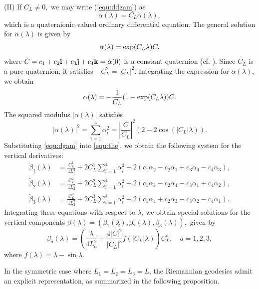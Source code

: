 \documentclass [12pt,a4paper]{amsart}
\newcommand{\bi}{{\bf i}}
\newcommand{\bj}{{\bf j}}
\newcommand{\bk}{{\bf k}}
\theoremstyle{plain}
\theoremstyle{definition}
\numberwithin{equation}{section}
\begin{document}
\smallskip
(II) If $C_L\neq0,$ we may write (\ref{equ:ddgam}) as
\begin{equation*}
\ddot\alpha(\lambda)=C_L\dot\alpha(\lambda),
\end{equation*}
which is a quaternionic-valued ordinary differential equation. The general solution for $\dot\alpha(\lambda)$ is given by
$$\dot\alpha(\lambda)={\rm exp}(C_L\lambda)C,$$
where $C=c_1+c_2\bi+c_3\bj+c_4\bk=\dot\alpha(0)$ is a constant quaternion (cf. \cite{CM}).
Since $C_L$ is a pure quaternion, it satisfies $-C_L^2=|C_L|^2.$ Integrating the expression for $\dot\alpha(\lambda)$, we obtain
\begin{equation*}\label{equ:gam}
\alpha(\lambda)=-\frac{1}{C_L}(1-{\rm exp}({C_L \lambda}))C.
\end{equation*}
The squared modulus $|\alpha(\lambda)|$ satisfies
$$
|\alpha(\lambda)|^2=\sum_{i=1}^4\alpha_i^2=\left|\frac{C}{C_L}\right|^2(2-2\cos(|C_L|\lambda)).
$$
Substituting \eqref{equ:dgam} into \eqref{equ:the}, we obtain the following system for the vertical derivatives:
\begin{align}
\dot\beta_{1}(\lambda) &= \frac{C_L^1}{4L_1^2} + 2C_L^1 \sum_{i=1}^4 \alpha_i^2 + 2(c_1\alpha_2 - c_2\alpha_1 + c_3\alpha_4 - c_4\alpha_3), \nonumber \\
\dot\beta_{2}(\lambda) &= \frac{C_L^2}{4L_2^2} + 2C_L^2 \sum_{i=1}^4 \alpha_i^2 + 2(c_1\alpha_3 - c_2\alpha_4 - c_3\alpha_1 + c_4\alpha_2), \label{equ:betadot} \\
\dot\beta_{3}(\lambda) &= \frac{C_L^3}{4L_3^2} + 2C_L^3 \sum_{i=1}^4 \alpha_i^2 + 2(c_1\alpha_4 + c_2\alpha_3 - c_3\alpha_2 - c_4\alpha_1). \nonumber
\end{align}
Integrating these equations with respect to $\lambda$, we obtain special solutions for the vertical components $\beta(\lambda) = (\beta_1(\lambda), \beta_2(\lambda), \beta_3(\lambda)),$ given by
\begin{equation}
\beta_{a}(\lambda) = \left( \frac{\lambda}{4L_a^2} + \frac{4|C|^2}{|C_L|^3} f(|C_L|\lambda) \right) C_L^a, \quad a = 1, 2, 3,
\end{equation}
where $f(\lambda) = \lambda - \sin \lambda.$ 



In the symmetric case where $L_1=L_2=L_3=L$, the Riemannian geodesics admit an explicit representation, as summarized in the following proposition.
\end{document}
